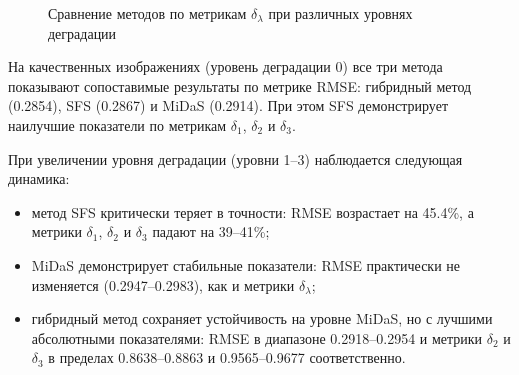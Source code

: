 \begin{figure}[H]
    \caption{Сравнение методов по метрикам $\delta_{\lambda}$ при различных уровнях деградации}
    \label{fig:comparison-by-degradation}
\end{figure}

На качественных изображениях (уровень деградации 0) все три метода показывают сопоставимые результаты по метрике RMSE: 
гибридный метод (0.2854), SFS (0.2867) и MiDaS (0.2914).
При этом SFS демонстрирует наилучшие показатели по метрикам $\delta_1$, $\delta_2$ и $\delta_3$.

При увеличении уровня деградации (уровни 1--3) наблюдается следующая динамика:
\begin{itemize}
    \item метод SFS критически теряет в точности: RMSE возрастает на 45.4\%, а метрики $\delta_1$, $\delta_2$ и $\delta_3$ падают на 39--41\%;
    \item MiDaS демонстрирует стабильные показатели: RMSE практически не изменяется (0.2947--0.2983), как и метрики $\delta_\lambda$;
    \item гибридный метод сохраняет устойчивость на уровне MiDaS, но с лучшими абсолютными показателями:
RMSE в диапазоне 0.2918--0.2954 и метрики $\delta_2$ и $\delta_3$ в пределах 0.8638--0.8863 и 0.9565--0.9677 соответственно.
\end{itemize}

